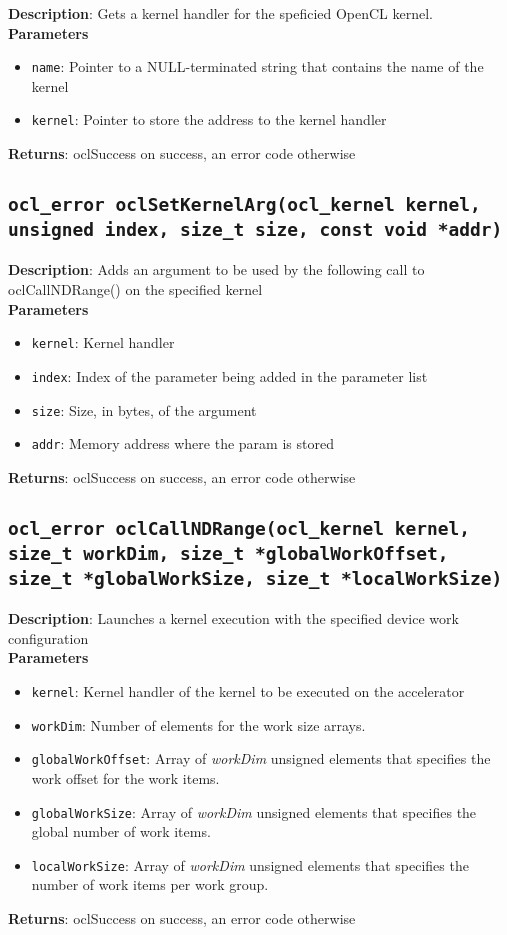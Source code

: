 \textbf{Description}: Gets a kernel handler for the speficied OpenCL kernel. \\
\textbf{Parameters}
\begin{itemize}
  \item \texttt{name}: Pointer to a NULL\hyp{}terminated string that contains the name of the kernel
  \item \texttt{kernel}: Pointer to store the address to the kernel handler
\end{itemize}
\textbf{Returns}: oclSuccess on success, an error code otherwise

\subsection{\texttt{ocl\_error oclSetKernelArg(ocl\_kernel kernel, unsigned index, size\_t size, 
const void *addr)}}

\textbf{Description}: Adds an argument to be used by the following call to oclCallNDRange() on 
the specified kernel \\
\textbf{Parameters}
\begin{itemize}
  \item \texttt{kernel}: Kernel handler
  \item \texttt{index}: Index of the parameter being added in the parameter list
  \item \texttt{size}: Size, in bytes, of the argument
  \item \texttt{addr}: Memory address where the param is stored
\end{itemize}
\textbf{Returns}: oclSuccess on success, an error code otherwise

\subsection{\texttt{ocl\_error oclCallNDRange(ocl\_kernel kernel, size\_t workDim, size\_t 
*globalWorkOffset, size\_t *globalWorkSize, size\_t *localWorkSize)}}

\textbf{Description}: Launches a kernel execution with the specified device work configuration\\
\textbf{Parameters}
\begin{itemize}
  \item \texttt{kernel}: Kernel handler of the kernel to be executed on the accelerator
  \item \texttt{workDim}: Number of elements for the work size arrays.
  \item \texttt{globalWorkOffset}: Array of \emph{workDim} unsigned elements that specifies the work 
    offset for the work items.
  \item \texttt{globalWorkSize}: Array of \emph{workDim} unsigned elements that specifies the global 
    number of work items.
  \item \texttt{localWorkSize}: Array of \emph{workDim} unsigned elements that specifies the number 
    of work items per work group.
\end{itemize}
\textbf{Returns}: oclSuccess on success, an error code otherwise

